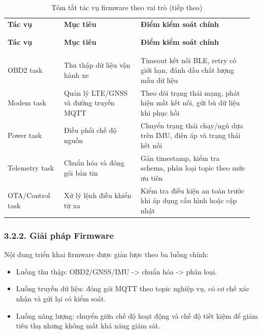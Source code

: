 \documentclass[a4paper]{extarticle}
\newcommand{\thesissettableid}[2]{%
  \renewcommand{\thetable}{#1}%
  \renewcommand{\theHtable}{#2}%
}
\providecommand{\tightlist}{%
  \setlength{\itemsep}{0pt}\setlength{\parskip}{0pt}}
\begin{document}
{\thesissettableid{3.2}{tab-condensed-ch3-firmware-task-roles}
\def\LTcaptype{table}
\begin{longtable}{|L{0.220\linewidth}|L{0.300\linewidth}|L{0.440\linewidth}|}
\caption{Tóm tắt tác vụ firmware theo vai trò}\label{tab:condensed-ch3-firmware-task-roles}\\
\hline \textbf{Tác vụ} & \textbf{Mục tiêu} & \textbf{Điểm kiểm soát chính} \\
\\\hline
\endfirsthead
\caption[]{Tóm tắt tác vụ firmware theo vai trò (tiếp theo)}\\
\hline \textbf{Tác vụ} & \textbf{Mục tiêu} & \textbf{Điểm kiểm soát chính} \\
\\\hline
\endhead
\\\hline
\endfoot
\endlastfoot
OBD2 task & Thu thập dữ liệu vận hành xe & Timeout kết nối BLE, retry có giới hạn, đánh dấu chất lượng mẫu dữ liệu \\\hline
Modem task & Quản lý LTE/GNSS và đường truyền MQTT & Theo dõi trạng thái mạng, phát hiện mất kết nối, gửi bù dữ liệu khi phục hồi \\\hline
Power task & Điều phối chế độ nguồn & Chuyển trạng thái chạy/ngủ dựa trên IMU, điện áp và trạng thái kết nối \\\hline
Telemetry task & Chuẩn hóa và đóng gói bản tin & Gán timestamp, kiểm tra schema, phân loại topic theo mức ưu tiên \\\hline
OTA/Control task & Xử lý lệnh điều khiển từ xa & Kiểm tra điều kiện an toàn trước khi áp dụng cấu hình hoặc cập nhật \\\hline
\end{longtable}
}

\subsubsection{3.2.2. Giải pháp Firmware}

Nội dung triển khai firmware được giản lược theo ba luồng chính:

\begin{itemize}
\tightlist
\item
  Luồng thu thập: OBD2/GNSS/IMU -> chuẩn hóa -> phân loại.
\item
  Luồng truyền dữ liệu: đóng gói MQTT theo topic nghiệp vụ, có cơ chế xác nhận và gửi lại có kiểm soát.
\item
  Luồng năng lượng: chuyển giữa chế độ hoạt động và chế độ tiết kiệm để giảm tiêu thụ nhưng không mất khả năng giám sát.
\end{itemize}
\end{document}
